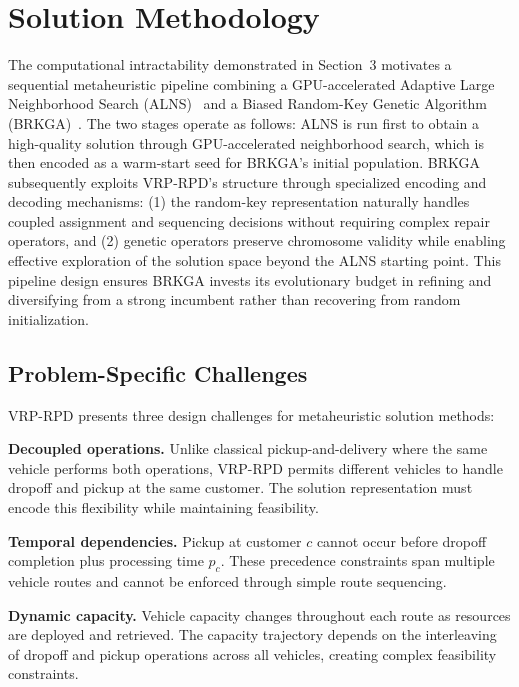 \documentclass{article}
\begin{document}
\section{Solution Methodology}
\label{sec:methodology}

The computational intractability demonstrated in Section~3 motivates a sequential metaheuristic pipeline combining a GPU-accelerated Adaptive Large Neighborhood Search (ALNS)~\cite{ropke2006adaptive} and a Biased Random-Key Genetic Algorithm (BRKGA)~\cite{goncalves2011}. The two stages operate as follows: ALNS is run first to obtain a high-quality solution through GPU-accelerated neighborhood search, which is then encoded as a warm-start seed for BRKGA's initial population. BRKGA subsequently exploits VRP-RPD's structure through specialized encoding and decoding mechanisms: (1) the random-key representation naturally handles coupled assignment and sequencing decisions without requiring complex repair operators, and (2) genetic operators preserve chromosome validity while enabling effective exploration of the solution space beyond the ALNS starting point. This pipeline design ensures BRKGA invests its evolutionary budget in refining and diversifying from a strong incumbent rather than recovering from random initialization.

\subsection{Problem-Specific Challenges}

VRP-RPD presents three design challenges for metaheuristic solution methods:

\textbf{Decoupled operations.} Unlike classical pickup-and-delivery where the same vehicle performs both operations, VRP-RPD permits different vehicles to handle dropoff and pickup at the same customer. The solution representation must encode this flexibility while maintaining feasibility.

\textbf{Temporal dependencies.} Pickup at customer $c$ cannot occur before dropoff completion plus processing time $p_c$. These precedence constraints span multiple vehicle routes and cannot be enforced through simple route sequencing.

\textbf{Dynamic capacity.} Vehicle capacity changes throughout each route as resources are deployed and retrieved. The capacity trajectory depends on the interleaving of dropoff and pickup operations across all vehicles, creating complex feasibility constraints.
\end{document}
